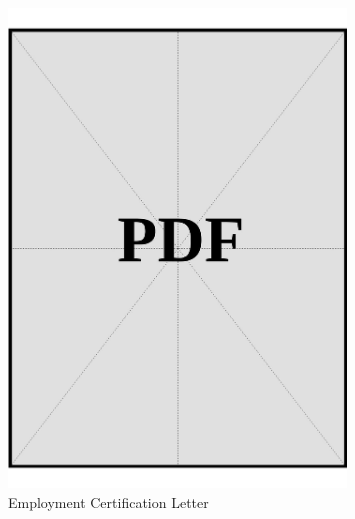 \begin{figure}[ht]
  \centering
  \includegraphics[page=1, width=0.8\textwidth]{../docs/applicant/employment/company-2/employment-letter.pdf}
  \caption{Employment Certification Letter}
  \label{pdf:company-2-certification-letter}
\end{figure}

\clearpage